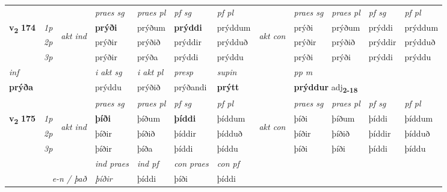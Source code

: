 \begin{longtable}[l]{X>{\footnotesize\itshape}llXXXXlXXXX}
 & &   & \textit{praes sg}  & \textit{praes pl}    & \textit{ pf sg} & \textit{pf pl} & & \textit{praes sg}  & \textit{praes pl}    & \textit{pf sg} & \textit{pf pl }  \\ \cmidrule{4-7} \cmidrule{9-12}
 \multirow{2}{*}{{{\textbf{v{\textsubscript{2}}} \Large{\textbf{174}}}}}  & 1p & \multirow{3}{*}{\begin{turn}{90}\textit{akt ind}\end{turn}} & \textbf{prýði} & prýðum & \textbf{prýddi} & prýddum & \multirow{3}{*}{\begin{turn}{90}\textit{akt con}\end{turn}} &prýði & prýðum & prýddi & prýddum\\*
 & 2p &  &  prýðir  & prýðið & prýddir & prýdduð & & prýðir & prýðið & prýddir & prýdduð \\*
 & 3p &  & prýðir & prýða & prýddi & prýddu & & prýði & prýði& prýddi & prýddu \\*
\cmidrule{4-7} \cmidrule{9-12}

   {\textit{inf}} & &  & \textit{i akt sg} & \textit{i akt pl}   & \textit{presp} & \textit{supin}  && \textit{pp m} \\*
  {\textbf{prýða}} & && prýddu  & prýðið   & prýðandi &  \textbf{prýtt}  && \multicolumn{2}{l}{\textbf{prýddur} adj\textbf{\textsubscript{2-18}}} \\*

\midrule

 & &   & \textit{praes sg}  & \textit{praes pl}    & \textit{ pf sg} & \textit{pf pl} & & \textit{praes sg}  & \textit{praes pl}    & \textit{pf sg} & \textit{pf pl }  \\ \cmidrule{4-7} \cmidrule{9-12}
 \multirow{2}{*}{{{\textbf{v{\textsubscript{2}}} \Large{\textbf{175}}}}}  & 1p & \multirow{3}{*}{\begin{turn}{90}\textit{akt ind}\end{turn}} & \textbf{þíði} & þíðum & \textbf{þíddi} & þíddum & \multirow{3}{*}{\begin{turn}{90}\textit{akt con}\end{turn}} &þíði & þíðum & þíddi & þíddum\\*
 & 2p &  &  þíðir  & þíðið & þíddir & þídduð & & þíðir & þíðið & þíddir & þídduð \\*
 & 3p &  & þíðir & þíða & þíddi & þíddu & & þíði & þíði& þíddi & þíddu \\*
\cmidrule{4-7} \cmidrule{9-12}

   && &  \textit{ind praes} & \textit{ind pf} & \textit{con praes} & \textit{con pf} \\*
\multicolumn{3}{r}{\textit{e-n / það}} & þíðir & þíddi & þíði & þíddi \\*


\end{longtable}

